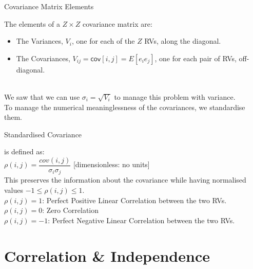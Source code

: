 \documentclass[10pt,sans,english,compress,xcolor=dvipsnames]{beamer}
\begin{document}
\begin{frame}{Covariance Matrix Elements}
\footnotesize

The elements of a $Z\times Z$ covariance matrix are:\\[1ex]
\begin{itemize}
\item The Variances, $V_i$, one for each of the $Z$ RVs, along the diagonal.
\item The Covariances, $V_{ij} = \mathsf{cov}[i,j] = E[e_i e_j]$, one for each pair of RVs, off-diagonal.
\end{itemize}

\\[1ex]

We saw that we can use $\sigma_i = \sqrt{V_i}$ to manage this problem with variance. \\[1ex]

To manage the numerical meaninglessness of the covariances, we standardise them.\\[1ex]
\end{frame} 





\begin{frame}{Standardised Covariance}

 is defined as:\\

$\rho(i,j) = \dfrac{cov(i,j)}{\sigma_i \sigma_j}$ [dimensionless: no units]\\[1ex]

This preserves the information about the covariance while having normalised values $-1 \leq \rho(i,j) \leq 1$.\\[1ex]

$\rho(i,j)=1$: Perfect Positive Linear Correlation between the two RVs.\\[1ex]
$\rho(i,j)=0$: Zero Correlation\\[1ex]
$\rho(i,j)=-1$: Perfect Negative Linear Correlation between the two RVs.\\[1ex]

\end{frame} 


\section{Correlation \& Independence}
\end{document}
